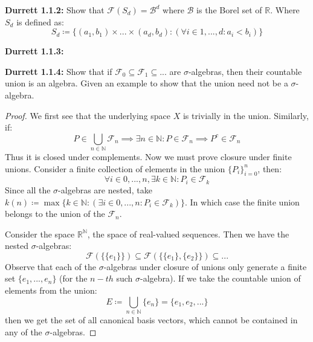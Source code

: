 \documentclass[10pt,letterpaper]{article} %
\begin{document}
\textbf{Durrett 1.1.2:} Show that $\mathcal{F}(S_d) = \mathcal{B}^d$ where $\mathcal{B}$ is the Borel set of $\mathbb{R}$. Where $S_d$ is defined as:
\begin{equation*}
S_d \coloneq \{(a_1, b_1) \times ... \times (a_d, b_d) : (\forall i \in 1, ..., d: a_i < b_i)\}
\end{equation*}

\textbf{Durrett 1.1.3:}

\textbf{Durrett 1.1.4:} Show that if $\mathcal{F}_0 \subseteq \mathcal{F}_1 \subseteq ...$ are $\sigma$-algebras, then their countable union is an algebra. Given an example to show that the union need not be a $\sigma$-algebra.
\begin{proof}
We first see that the underlying space $X$ is trivially in the union. Similarly, if:
\begin{equation*}
P \in \bigcup_{n \in \mathbb{N}}\mathcal{F}_n \implies \exists n \in \mathbb{N}: P \in \mathcal{F}_n \implies P^c \in \mathcal{F}_n
\end{equation*}
Thus it is closed under complements. Now we must prove closure under finite unions. Consider a finite collection of elements in the union $\{P_i\}_{i=0}^n$, then:
\begin{equation*}
\forall i \in 0, ..., n, \exists k \in \mathbb{N}: P_i \in \mathcal{F}_k
\end{equation*}
Since all the $\sigma$-algebras are nested, take $k(n) \coloneq \max\{k \in \mathbb{N}: (\exists i \in 0, ..., n: P_i \in \mathcal{F}_k)\}$. In which case the finite union belongs to the union of the $\mathcal{F}_n$.

Consider the space $\mathbb{R}^\mathbb{N}$, the space of real-valued sequences. Then we have the nested $\sigma$-algebras:
\begin{equation*}
\mathcal{F}(\{\{e_1\}\}) \subseteq \mathcal{F}(\{\{e_1\}, \{e_2\}\}) \subseteq ...
\end{equation*}
Observe that each of the $\sigma$-algebras under closure of unions only generate a finite set $\{e_1, ..., e_n\}$ (for the $n-th$ such $\sigma$-algebra). If we take the countable union of elements from the union:
\begin{equation*}
E \coloneq \bigcup_{n \in \mathbb{N}}\{e_n\} = \{e_1, e_2, ...\}
\end{equation*}
then we get the set of all canonical basis vectors, which cannot be contained in any of the $\sigma$-algebras.
\end{proof}
\end{document}
